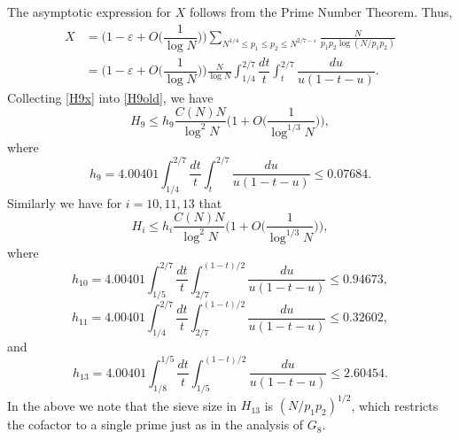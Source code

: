 \documentclass[12pt, a4paper]{amsart}
\def\le{\leqslant}
\theoremstyle{plain}
\theoremstyle{remark}
\numberwithin{equation}{section}
\begin{document}
The asymptotic expression for $X$ follows from the Prime Number Theorem. Thus, 
\begin{equation}\label{H9x}
\begin{aligned}
X &= \bigg(1-\varepsilon+O\bigg(\dfrac{1}{\log N}\bigg)\bigg) 
\sum_{N^{1/4} \leqslant p_1 \le p_2 \le N^{2/7-\varepsilon}} \frac{N}{p_1p_2 \log(N/p_1p_2)} \\
&= \bigg(1-\varepsilon+O\bigg(\dfrac{1}{\log N}\bigg)\bigg)\frac{N}{\log N} \int_{1/4}^{2/7}\dfrac{dt}{t}\int_{t}^{2/7}\dfrac{du}{u(1-t-u)}.
\end{aligned}
\end{equation}
Collecting \eqref{H9x} into \eqref{H9old}, we have
\begin{equation}\label{H9}
H_9 \le h_9\dfrac{C(N)N}{\log^2 N} \bigg(1+O\bigg(\dfrac{1}{\log^{1/3}N}\bigg)\bigg),
\end{equation}
where
\begin{equation}\label{h9}
h_{9}=4.00401\int_{1/4}^{2/7}\dfrac{dt}{t}\int_{t}^{2/7}\dfrac{du}{u(1-t-u)}
\le 0.07684.
\end{equation}
Similarly we have for $i=10,11,13$ that 
\begin{equation}\label{H10-13}
H_i \le h_i\dfrac{C(N)N}{\log^2 N}\bigg(1+O\bigg(\dfrac{1}{\log^{1/3}N}\bigg)\bigg),
\end{equation}
where
\begin{equation}\label{h10}
h_{10}=4.00401\int_{1/5}^{2/7}\dfrac{dt}{t}\int_{2/7}^{(1-t)/2}\dfrac{du}{u(1-t-u)}
\le 0.94673,
\end{equation}
\begin{equation}\label{h11}
h_{11}=4.00401\int_{1/4}^{2/7}\dfrac{dt}{t}\int_{2/7}^{(1-t)/2}\dfrac{du}{u(1-t-u)}
\le 0.32602,
\end{equation}
and 
\begin{equation}\label{h13}
h_{13}=4.00401\int_{1/8}^{1/5}\dfrac{dt}{t}\int_{1/5}^{(1-t)/2}\dfrac{du}{u(1-t-u)}
\le 2.60454. 
\end{equation}
In the above we note that the sieve size in $H_{13}$ is $(N/p_1p_2)^{1/2}$, 
which restricts the cofactor to a single prime just as in the analysis of $G_8$. 
\end{document}
